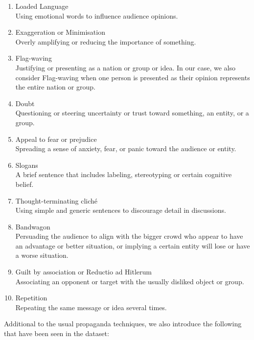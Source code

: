 \documentclass[sigconf]{acmart}
\begin{document}
\begin{enumerate}
  \item Loaded Language\\
  Using emotional words to influence audience opinions. 
  
  \item Exaggeration or Minimisation\\
  Overly amplifying or reducing the importance of something. 
  
  \item Flag-waving\\
  Justifying or presenting as a nation or group or idea. In our case, we also consider Flag-waving when one person is presented as their opinion represents the entire nation or group.
  
  \item Doubt\\
  Questioning or steering uncertainty or trust toward something, an entity, or a group.
  
  \item Appeal to fear or prejudice \\
  Spreading a sense of anxiety, fear, or panic toward the audience or entity.
  
  \item Slogans \\
  A brief sentence that includes labeling, stereotyping or certain cognitive belief.
  
  \item Thought-terminating cliché\\
  Using simple and generic sentences to discourage detail in discussions.

  \item Bandwagon\\
  Persuading the audience to align with the bigger crowd who appear to have an advantage or better situation, or implying a certain entity will lose or have a worse situation.  
  
  \item Guilt by association or Reductio ad Hitlerum\\
  Associating an opponent or target with the usually disliked object or group.
  
  \item Repetition\\
  Repeating the same message or idea several times. 
\end{enumerate}

Additional to the usual propaganda techniques, we also introduce the following that have been seen in the dataset:
\end{document}
